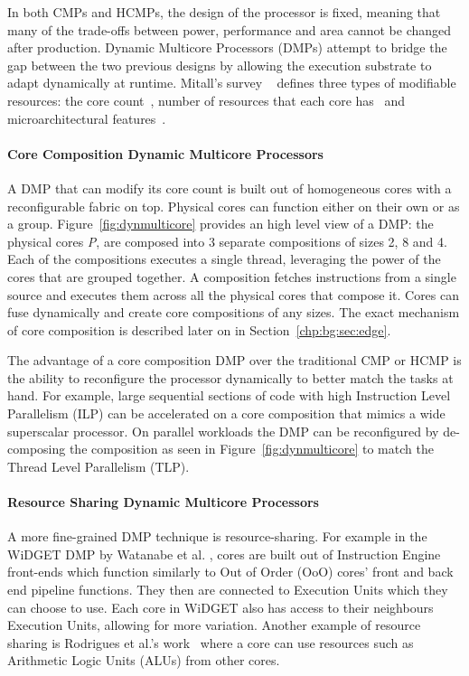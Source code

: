 In both CMPs and HCMPs, the design of the processor is fixed, meaning that many of the trade-offs between power, performance and area cannot be changed after production.
Dynamic Multicore Processors (DMPs) attempt to bridge the gap between the two previous designs by allowing the execution substrate to adapt dynamically at runtime.
Mitall's survey ~\cite{MittalSurv2016} defines three types of modifiable resources: the core count~\cite{ipek2007CoreFusion,kim2007tflex,pricopi2012bahurupi}, number of resources that each core has~\cite{Homayoun3DPooling2012} and microarchitectural features~\cite{fallinhetblock2014,BauerRSE08,tavanaElastic}.

\paragraph*{Core Composition Dynamic Multicore Processors}


A DMP that can modify its core count is built out of homogeneous cores with a reconfigurable fabric on top.
Physical cores can function either on their own or as a group.
Figure~\ref{fig:dynmulticore} provides an high level view of a DMP: the physical cores \textit{P}, are composed into 3 separate compositions of sizes 2, 8 and 4.
Each of the compositions executes a single thread, leveraging the power of the cores that are grouped together.
A composition fetches instructions from a single source and executes them across all the physical cores that compose it.
Cores can fuse dynamically and create core compositions of any sizes.
The exact mechanism of core composition is described later on in Section~\ref{chp:bg:sec:edge}.

The advantage of a core composition DMP over the traditional CMP or HCMP is the ability to reconfigure the processor dynamically to better match the tasks at hand.
For example, large sequential sections of code with high Instruction Level Parallelism (ILP) can be accelerated on a core composition that mimics a wide superscalar processor.
On parallel workloads the DMP can be reconfigured by de-composing the composition as seen in Figure~\ref{fig:dynmulticore} to match the Thread Level Parallelism (TLP).

\paragraph*{Resource Sharing Dynamic Multicore Processors}
A more fine-grained DMP technique is resource-sharing.
For example in the WiDGET DMP by Watanabe et al. \cite{Watanabe2010Widget}, cores are built out of Instruction Engine front-ends which function similarly to Out of Order (OoO) cores' front and back end pipeline functions.
They then are connected to Execution Units which they can choose to use.
Each core in WiDGET also has access to their neighbours Execution Units, allowing for more variation.
Another example of resource sharing is Rodrigues et al.'s work~\cite{rodrigues2014perf} where a core can use resources such as Arithmetic Logic Units (ALUs) from other cores.

